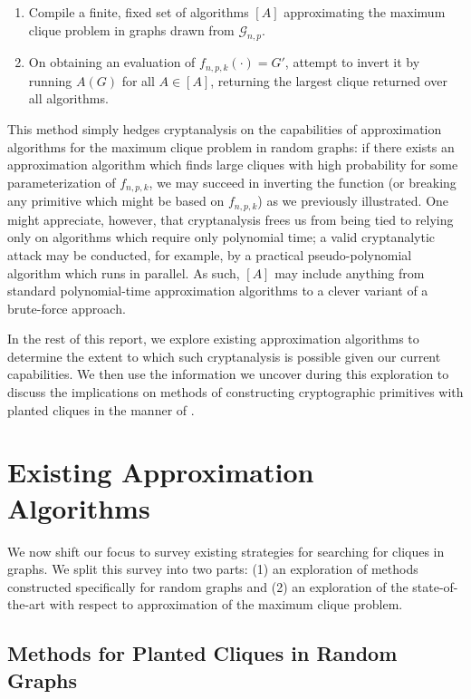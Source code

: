 \documentclass{article}
\theoremstyle{definition}
\begin{document}
\begin{enumerate}
\item{Compile a finite, fixed set of algorithms $[A]$ approximating the maximum clique problem in graphs drawn from $\mathcal{G}_{n,p}$.}
\item{On obtaining an evaluation of $f_{n,p,k}(\cdot)=G'$, attempt to invert it by running 
$A(G)$ for all $A \in [A]$, returning the largest clique returned over all algorithms.}
\end{enumerate}

\noindent This method simply hedges cryptanalysis on the capabilities of approximation 
algorithms for the maximum clique problem in random graphs: if there exists an approximation 
algorithm which finds large cliques with high probability for some parameterization of 
$f_{n,p,k}$, we may succeed in inverting the function (or breaking any primitive which might 
be based on $f_{n,p,k}$) as we previously illustrated.    One might appreciate, however,
that cryptanalysis frees us from being tied to relying only on algorithms which 
require only polynomial time; a valid cryptanalytic attack may be conducted, for example, 
by a practical pseudo-polynomial algorithm which runs in parallel.  As such, 
$[A]$ may include anything from standard polynomial-time approximation algorithms 
to a clever variant of a brute-force approach.

In the rest of this report, we explore existing approximation algorithms 
to determine the extent to which such cryptanalysis is possible given our current capabilities.
We then use the information we uncover during this exploration to discuss the implications 
on methods of constructing cryptographic primitives with planted cliques in the manner of 
\cite{HidingCliques}.  

\section{Existing Approximation Algorithms}

We now shift our focus to survey existing strategies for searching for cliques in graphs.
We split this survey into two parts: (1) an exploration of methods constructed specifically 
for random graphs and (2) an exploration of the state-of-the-art with respect to approximation 
of the maximum clique problem.

\subsection{Methods for Planted Cliques in Random Graphs}
\end{document}
